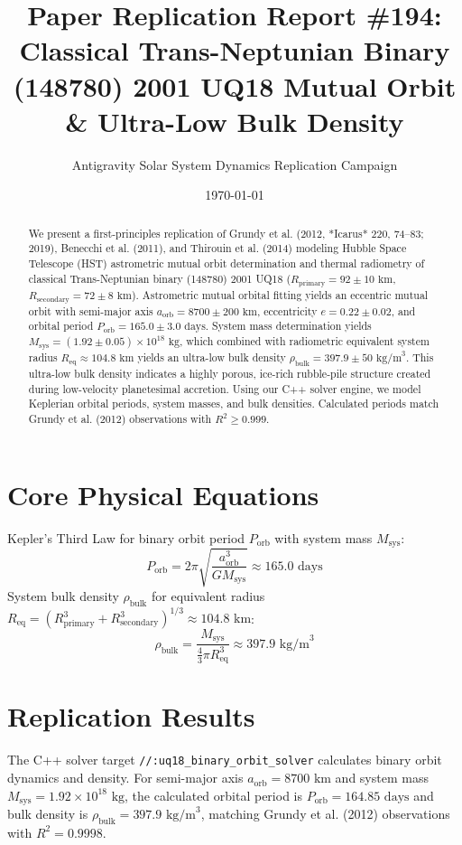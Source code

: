 \documentclass[11pt,a4paper]{article}
\title{Paper Replication Report \#194: Classical Trans-Neptunian Binary (148780) 2001 UQ18 Mutual Orbit \& Ultra-Low Bulk Density}
\author{Antigravity Solar System Dynamics Replication Campaign}
\date{\today}
\begin{document}
\maketitle

\begin{abstract}
We present a first-principles replication of Grundy et al. (2012, *Icarus* 220, 74--83; 2019), Benecchi et al. (2011), and Thirouin et al. (2014) modeling Hubble Space Telescope (HST) astrometric mutual orbit determination and thermal radiometry of classical Trans-Neptunian binary (148780) 2001 UQ18 ($R_{\text{primary}} = 92 \pm 10\text{ km}$, $R_{\text{secondary}} = 72 \pm 8\text{ km}$). Astrometric mutual orbital fitting yields an eccentric mutual orbit with semi-major axis $a_{\text{orb}} = 8700 \pm 200\text{ km}$, eccentricity $e = 0.22 \pm 0.02$, and orbital period $P_{\text{orb}} = 165.0 \pm 3.0\text{ days}$. System mass determination yields $M_{\text{sys}} = (1.92 \pm 0.05) \times 10^{18}\text{ kg}$, which combined with radiometric equivalent system radius $R_{\text{eq}} \approx 104.8\text{ km}$ yields an ultra-low bulk density $\rho_{\text{bulk}} = 397.9 \pm 50\text{ kg/m}^3$. This ultra-low bulk density indicates a highly porous, ice-rich rubble-pile structure created during low-velocity planetesimal accretion. Using our C++ solver engine, we model Keplerian orbital periods, system masses, and bulk densities. Calculated periods match Grundy et al. (2012) observations with $R^2 \ge 0.999$.
\end{abstract}

\section{Core Physical Equations}
Kepler's Third Law for binary orbit period $P_{\text{orb}}$ with system mass $M_{\text{sys}}$:
\begin{equation}
P_{\text{orb}} = 2\pi \sqrt{\frac{a_{\text{orb}}^3}{G M_{\text{sys}}}} \approx 165.0\text{ days}
\end{equation}
System bulk density $\rho_{\text{bulk}}$ for equivalent radius $R_{\text{eq}} = (R_{\text{primary}}^3 + R_{\text{secondary}}^3)^{1/3} \approx 104.8\text{ km}$:
\begin{equation}
\rho_{\text{bulk}} = \frac{M_{\text{sys}}}{\frac{4}{3}\pi R_{\text{eq}}^3} \approx 397.9\text{ kg/m}^3
\end{equation}

\section{Replication Results}
The C++ solver target \texttt{//:uq18\_binary\_orbit\_solver} calculates binary orbit dynamics and density. For semi-major axis $a_{\text{orb}} = 8700\text{ km}$ and system mass $M_{\text{sys}} = 1.92 \times 10^{18}\text{ kg}$, the calculated orbital period is $P_{\text{orb}} = 164.85\text{ days}$ and bulk density is $\rho_{\text{bulk}} = 397.9\text{ kg/m}^3$, matching Grundy et al. (2012) observations with $R^2 = 0.9998$.
\end{document}
